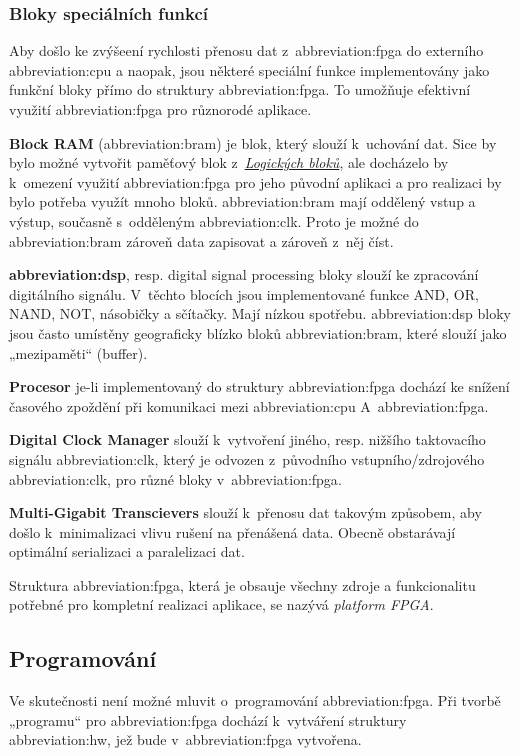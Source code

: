 \documentclass[a4paper, twoside, 11pt]{article}
\begin{document}
		\subsubsection{Bloky speciálních funkcí}
			Aby došlo ke zvýšeení rychlosti přenosu dat z~\gls{abbreviation:fpga} do externího \gls{abbreviation:cpu} a naopak, jsou některé speciální funkce implementovány jako funkční bloky přímo do struktury \gls{abbreviation:fpga}. To umožňuje efektivní využití \gls{abbreviation:fpga} pro různorodé aplikace. \cite{Sass2010}\par
			\textbf{Block RAM} (\gls{abbreviation:bram}) je blok, který slouží k~uchování dat. Sice by bylo možné vytvořit paměťový blok z~\hyperref[subsubsec:logicke-bloky]{\textit{Logických bloků}}, ale docházelo by k~omezení využití \gls{abbreviation:fpga} pro jeho původní aplikaci a pro realizaci by bylo potřeba využít mnoho bloků. \gls{abbreviation:bram} mají oddělený vstup a výstup, současně s~odděleným \gls{abbreviation:clk}. Proto je možné do \gls{abbreviation:bram} zároveň data zapisovat a zároveň z~něj číst. \cite{Sass2010}\par
			\textbf{\gls{abbreviation:dsp}}, resp. digital signal processing bloky slouží ke zpracování digitálního signálu. V~těchto blocích jsou implementované funkce AND, OR, NAND, NOT, násobičky a sčítačky. Mají nízkou spotřebu. \gls{abbreviation:dsp} bloky jsou často umístěny geograficky blízko bloků \gls{abbreviation:bram}, které slouží jako „mezipaměti“ (buffer). \cite{Sass2010}\par
			\textbf{Procesor} je-li implementovaný do struktury \gls{abbreviation:fpga} dochází ke snížení časového zpoždění při komunikaci mezi \gls{abbreviation:cpu} A~\gls{abbreviation:fpga}. \cite{Sass2010}\par
			\textbf{Digital Clock Manager} slouží k~vytvoření jiného, resp. nižšího taktovacího signálu \gls{abbreviation:clk}, který je odvozen z~původního vstupního/zdrojového \gls{abbreviation:clk}, pro různé bloky v~\gls{abbreviation:fpga}. \cite{Sass2010}\par
			\textbf{Multi-Gigabit Transcievers} slouží k~přenosu dat takovým způsobem, aby došlo k~minimalizaci vlivu rušení na přenášená data. Obecně obstarávají optimální serializaci a paralelizaci dat. \cite{Sass2010}\par
			Struktura \gls{abbreviation:fpga}, která je obsauje všechny zdroje a funkcionalitu potřebné pro kompletní realizaci aplikace, se nazývá \textit{platform FPGA}.
		\subsection{Programování}
			Ve skutečnosti není možné mluvit o~programování \gls{abbreviation:fpga}. Při tvorbě „programu“ pro \gls{abbreviation:fpga} dochází k~vytváření struktury \gls{abbreviation:hw}, jež bude v~\gls{abbreviation:fpga} vytvořena.
\end{document}
